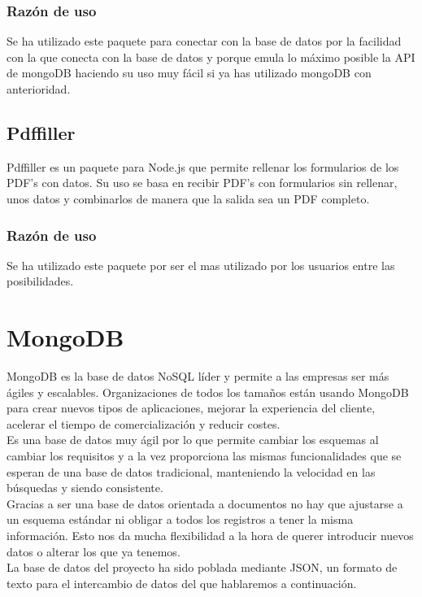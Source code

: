 \subsubsection{Razón de uso}
Se ha utilizado este paquete para conectar con la base de datos por la facilidad con la que conecta con la base de datos y porque emula lo máximo posible la API de mongoDB haciendo su uso muy fácil si ya has utilizado mongoDB con anterioridad.

\subsection{Pdffiller}
Pdffiller es un paquete para Node.js que permite rellenar los formularios de los PDF’s con datos. Su uso se basa en recibir PDF’s con formularios sin rellenar, unos datos y combinarlos de manera que la salida sea un PDF completo. 

\subsubsection{Razón de uso}
Se ha utilizado este paquete por ser el mas utilizado por los usuarios entre las posibilidades. 

\section{MongoDB}
MongoDB es la base de datos NoSQL líder y permite a las empresas ser más ágiles y escalables. Organizaciones de todos los tamaños están usando MongoDB para crear nuevos tipos de aplicaciones, mejorar la experiencia del cliente, acelerar el tiempo de comercialización y reducir costes.\\

Es una base de datos muy ágil por lo que permite cambiar los esquemas al cambiar los requisitos y a la vez proporciona las mismas funcionalidades que se esperan de una base de datos tradicional, manteniendo la velocidad en las búsquedas y siendo consistente.\\

Gracias a ser una base de datos orientada a documentos no hay que ajustarse a un esquema estándar ni obligar a todos los registros a tener la misma información. Esto nos da mucha flexibilidad a la hora de querer introducir nuevos datos o alterar los que ya tenemos.\\

La base de datos del proyecto ha sido poblada mediante JSON, un formato de texto para el intercambio de datos del que hablaremos a continuación. 

